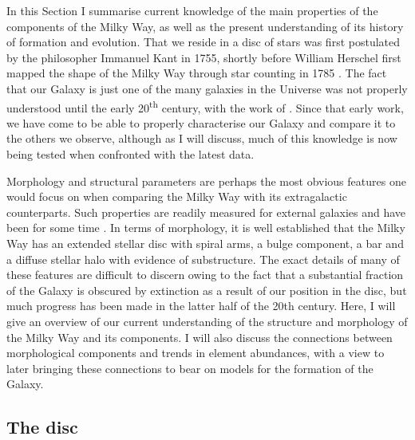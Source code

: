 
In this Section I summarise current knowledge of the main properties of the components of the Milky Way, as well as the present understanding of its history of formation and evolution. That we reside in a disc of stars was first postulated by the philosopher Immanuel Kant in 1755, shortly before William Herschel first mapped the shape of the Milky Way through star counting in 1785 \citep{Herschel01011785}. The fact that our Galaxy is just one of the many galaxies in the Universe was not properly understood until the early 20\textsuperscript{th} century, with the work of \citet{1929ApJ....69..103H}. Since that early work, we have come to be able to properly characterise our Galaxy and compare it to the others we observe, although as I will discuss, much of this knowledge is now being tested when confronted with the latest data.

Morphology and structural parameters are perhaps the most obvious features one would focus on when comparing the Milky Way with its extragalactic counterparts. Such properties are readily measured for external galaxies and have been for some time \citep[e.g.][]{1959HDP....53..311D}. In terms of morphology, it is well established that the Milky Way has an extended stellar disc with spiral arms, a bulge component, a bar and a diffuse stellar halo with evidence of substructure. The exact details of many of these features are difficult to discern owing to the fact that a substantial fraction of the Galaxy is obscured by extinction as a result of our position in the disc, but much progress has been made in the latter half of the 20th century. Here, I will give an overview of our current understanding of the structure and morphology of the Milky Way and its components. I will also discuss the connections between morphological components and trends in element abundances, with a view to later bringing these connections to bear on models for the formation of the Galaxy.

\subsection{The disc}

